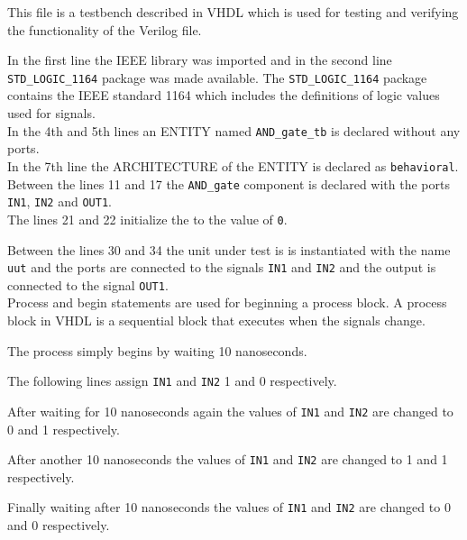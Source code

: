 \documentclass{article}
\begin{document}
\begin{center} %
    \lstset{
  caption= AND\_gate\_tb.vhd, 
  basicstyle=\footnotesize, frame=tb,
  xleftmargin=.2\textwidth, xrightmargin=.2\textwidth
}
    

\end{center}

This file is a testbench described in VHDL which is used for testing and verifying the functionality of the Verilog file. 

In the first line the IEEE library was imported and in the second line \verb|STD_LOGIC_1164| package was made available. The \verb|STD_LOGIC_1164| package contains the IEEE standard 1164 which includes the definitions of logic values used for signals. \\

In the 4th and 5th lines an ENTITY named \verb|AND_gate_tb| is declared without any ports. \\

In the 7th line the ARCHITECTURE of the ENTITY is declared as \verb|behavioral|. \\

Between the lines 11 and 17 the \verb|AND_gate| component is declared with the ports \verb|IN1|, \verb|IN2| and \verb|OUT1|.\\
The lines 21 and 22 initialize the to the value of \verb|0|.

Between the lines 30 and 34 the unit under test is is instantiated with the name \verb|uut| and the ports are connected to the signals \verb|IN1| and \verb|IN2| and the output is connected to the signal \verb|OUT1|.\\

Process and begin statements are used for beginning a process block. A process block in VHDL is a sequential block that executes when the signals change.

The process simply begins by waiting 10 nanoseconds.

The following lines assign \verb|IN1| and \verb|IN2| 1 and 0 respectively. 

After waiting for 10 nanoseconds again the values of \verb|IN1| and \verb|IN2| are changed to 0 and 1 respectively.

After another 10 nanoseconds the values of \verb|IN1| and \verb|IN2| are changed to 1 and 1 respectively.

Finally waiting after 10 nanoseconds the values of \verb|IN1| and \verb|IN2| are changed to 0 and 0 respectively. 
\end{document}
